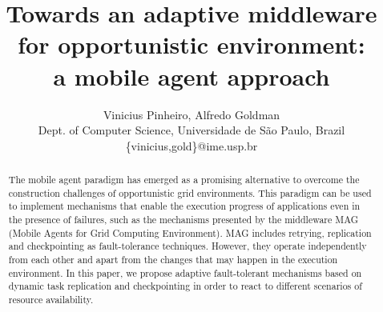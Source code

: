 \documentclass[times, 09pt, twocolumn]{article}
\begin{document}
\title{Towards an adaptive middleware for opportunistic environment:\\ a mobile agent approach}

\author{Vinicius Pinheiro, Alfredo Goldman\\
Dept. of Computer Science, Universidade de S\~ao Paulo, Brazil\\
\{vinicius,gold\}@ime.usp.br}

\maketitle
\thispagestyle{empty}

\begin{abstract}

The mobile agent paradigm has emerged as a promising alternative to overcome
the construction challenges of opportunistic grid environments.
This paradigm can be used to implement mechanisms that enable the
execution progress of applications even in the presence of failures, such as
the mechanisms presented by the middleware MAG (Mobile Agents for Grid
Computing Environment). 
MAG includes retrying, replication and checkpointing as
fault-tolerance techniques. However, they operate independently from
each other and apart from the changes that may happen in the execution environment.
In this paper, we propose adaptive fault-tolerant mechanisms based on dynamic task
replication and checkpointing in order to react to different scenarios of resource
availability.

\end{abstract}

\end{document}
